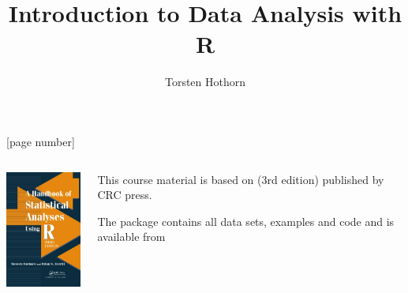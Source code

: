 \title{Introduction to Data Analysis with \textsf{R}}
\author[T. Hothorn]{Torsten Hothorn}

\date{}



\frame{\titlepage}

[page number]

\begin{frame}[fragile]

    \begin{columns}

       \begin{column}{3.5cm}
           \includegraphics[width = 3cm]{graphics/HSAUR}
       \end{column}

       \begin{column}{7.5cm}

           This course material is based on 
           (3rd edition) published by CRC press. 

           The \R{} package  contains all data sets, 
           examples and \R{} code and is available from 
       \end{column}
    \end{columns}

\end{frame}

